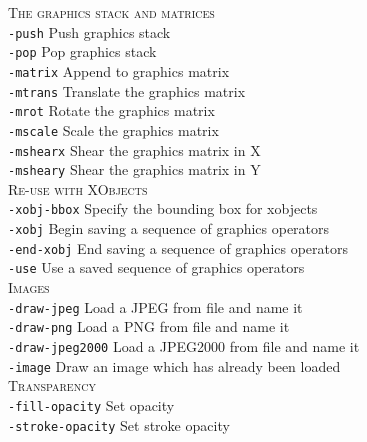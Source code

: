 \documentclass{book}
\begin{document}
{\begin{framed}
   \vspace{1.5mm}
   \noindent \textsc{The graphics stack and matrices}\\
   \noindent\verb!-push! Push graphics stack\\
   \noindent\verb!-pop! Pop graphics stack\\
   \noindent\verb!-matrix! Append to graphics matrix\\
   \noindent\verb!-mtrans! Translate the graphics matrix\\
   \noindent\verb!-mrot! Rotate the graphics matrix\\
   \noindent\verb!-mscale! Scale the graphics matrix\\
   \noindent\verb!-mshearx! Shear the graphics matrix in X\\
   \noindent\verb!-msheary! Shear the graphics matrix in Y\\

   \vspace{1.5mm}
   \noindent \textsc{Re-use with XObjects}\\
   \noindent\verb!-xobj-bbox! Specify the bounding box for xobjects\\
   \noindent\verb!-xobj! Begin saving a sequence of graphics operators\\
   \noindent\verb!-end-xobj! End saving a sequence of graphics operators\\
   \noindent\verb!-use! Use a saved sequence of graphics operators\\

   \vspace{1.5mm}
   \noindent \textsc{Images}\\
   \noindent\verb!-draw-jpeg! Load a JPEG from file and name it\\
   \noindent\verb!-draw-png! Load a PNG from file and name it\\
   \noindent\verb!-draw-jpeg2000! Load a JPEG2000 from file and name it\\
   \noindent\verb!-image! Draw an image which has already been loaded\\

   \vspace{1.5mm}
   \noindent \textsc{Transparency}\\
   \noindent\verb!-fill-opacity! Set opacity\\
   \noindent\verb!-stroke-opacity! Set stroke opacity\\


\end{framed}}
\end{document}
